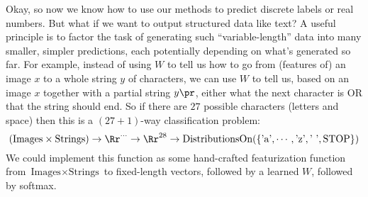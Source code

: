 
  Okay, so now we know how to use our methods to predict discrete labels or
  real numbers.  But what if we want to output structured data like text?  A
  useful principle is to factor the task of generating such ``variable-length''
  data into many smaller, simpler predictions, each potentially depending on
  what's generated so far.  For example, instead of using $W$ to tell us how to
  go from (features of) an image $x$ to a whole string $y$ of characters, we
  can use $W$ to tell us, based on an image $x$ together with a partial string
  $y\pr$, either what the next character is OR that the string should end.  So
  if there are $27$ possible characters (letters and space) then this is a
  $(27+1)$-way classification problem:
  $$
    (\text{Images} \times \text{Strings}) \to
    \Rr^{\cdots} \to
    \Rr^{28} \to
    \text{DistributionsOn}(\{\text{'a'}, \cdots, \text{'z'}, \text{' '}, \text{STOP}\})
  $$
  We could implement this function as some hand-crafted featurization function
  from $\text{Images} \times \text{Strings}$ to fixed-length vectors, followed
  by a learned $W$, followed by softmax.




